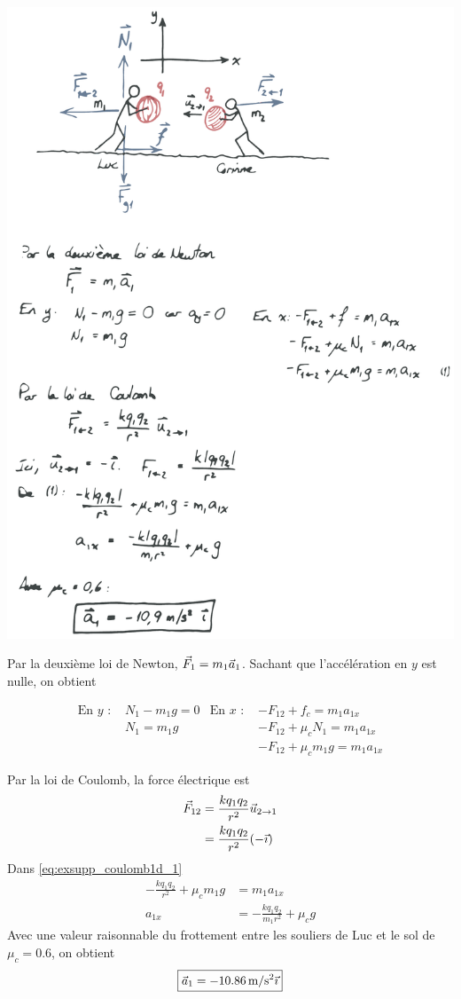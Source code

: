   \begin{center}
    \includegraphics[scale=0.45]{01-force-electrique/figures/pousse-charge-soln-dessin.pdf}
  \end{center}
  
  Par la deuxième loi de Newton, $\vec{F}_1 = m_1 \vec{a}_1$. Sachant que
  l'accélération en $y$ est nulle, on obtient

  \begin{align}
    \text{En } y \text{ : } & N_1 - m_1g = 0
    &  \text{En } x \text{ : } & -F_{12} + f_c = m_1 a_{1x}  \nonumber \\
    & N_1 = m_1 g
    & & -F_{12} + \mu_c N_1 = m_1 a_{1x}  \nonumber \\
    & & & -F_{12} + \mu_c m_1 g = m_1 a_{1x}
    \label{eq:exsupp_coulomb1d_1}
  \end{align}

  Par la loi de Coulomb, la force électrique est
  \begin{align*}
    \vec{F}_{12} &= \frac{kq_1q_2}{r^2} \vec{u}_{2\rightarrow 1} \\
             &= \frac{kq_1q_2}{r^2} (-\vec{\imath})
  \end{align*}
  Dans \ref{eq:exsupp_coulomb1d_1}
  \begin{align*}
    -\frac{kq_1q_2}{r^2} + \mu_c m_1 g &= m_1 a_{1x}  \\
    a_{1x} &= -\frac{kq_1q_2}{m_1r^2} + \mu_c g 
  \end{align*}
  Avec une valeur raisonnable du frottement entre les souliers de Luc et le sol
  de $\mu_c = \num{0.6}$, on obtient
  \[
    \boxed{\vec{a}_1 = \SI{-10.86}{m/s^2}\vec{\imath}}
  \]


